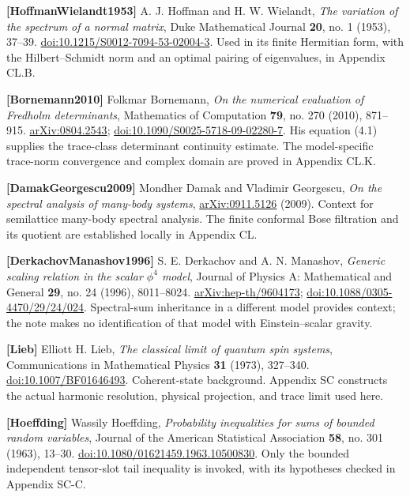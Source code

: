 \textbf{{[}HoffmanWielandt1953{]}} A. J. Hoffman and H. W. Wielandt, \emph{The variation of the spectrum of a normal matrix}, Duke Mathematical Journal \textbf{20}, no. 1 (1953), 37--39. \href{https://doi.org/10.1215/S0012-7094-53-02004-3}{doi:10.1215/S0012-7094-53-02004-3}. Used in its finite Hermitian form, with the Hilbert--Schmidt norm and an optimal pairing of eigenvalues, in Appendix CL.B.

\textbf{{[}Bornemann2010{]}} Folkmar Bornemann, \emph{On the numerical evaluation of Fredholm determinants}, Mathematics of Computation \textbf{79}, no. 270 (2010), 871--915. \href{https://arxiv.org/abs/0804.2543}{arXiv:0804.2543}; \href{https://doi.org/10.1090/S0025-5718-09-02280-7}{doi:10.1090/S0025-5718-09-02280-7}. His equation (4.1) supplies the trace-class determinant continuity estimate. The model-specific trace-norm convergence and complex domain are proved in Appendix CL.K.

\textbf{{[}DamakGeorgescu2009{]}} Mondher Damak and Vladimir Georgescu, \emph{On the spectral analysis of many-body systems}, \href{https://arxiv.org/abs/0911.5126}{arXiv:0911.5126} (2009). Context for semilattice many-body spectral analysis. The finite conformal Bose filtration and its quotient are established locally in Appendix CL.

\textbf{{[}DerkachovManashov1996{]}} S. E. Derkachov and A. N. Manashov, \emph{Generic scaling relation in the scalar \(\phi^4\) model}, Journal of Physics A: Mathematical and General \textbf{29}, no. 24 (1996), 8011--8024. \href{https://arxiv.org/abs/hep-th/9604173}{arXiv:hep-th/9604173}; \href{https://doi.org/10.1088/0305-4470/29/24/024}{doi:10.1088/0305-4470/29/24/024}. Spectral-sum inheritance in a different model provides context; the note makes no identification of that model with Einstein--scalar gravity.

\textbf{{[}Lieb{]}} Elliott H. Lieb, \emph{The classical limit of quantum spin systems}, Communications in Mathematical Physics \textbf{31} (1973), 327--340. \href{https://doi.org/10.1007/BF01646493}{doi:10.1007/BF01646493}. Coherent-state background. Appendix SC constructs the actual harmonic resolution, physical projection, and trace limit used here.

\textbf{{[}Hoeffding{]}} Wassily Hoeffding, \emph{Probability inequalities for sums of bounded random variables}, Journal of the American Statistical Association \textbf{58}, no. 301 (1963), 13--30. \href{https://doi.org/10.1080/01621459.1963.10500830}{doi:10.1080/01621459.1963.10500830}. Only the bounded independent tensor-slot tail inequality is invoked, with its hypotheses checked in Appendix SC-C.

